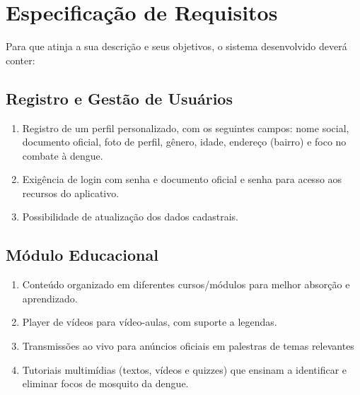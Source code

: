 \documentclass[a4paper, 12pt]{article}
\begin{document}
\newpage
\section{Especificação de Requisitos}

Para que atinja a sua descrição e seus objetivos, o sistema desenvolvido deverá conter:

\subsection{Registro e Gestão de Usuários}
\begin{enumerate}
    \item Registro de um perfil personalizado, com os seguintes campos: nome social, documento oficial, foto de perfil, gênero, idade, endereço (bairro) e foco no combate à dengue.
    \item Exigência de login com senha e documento oficial e senha para acesso aos recursos do aplicativo.
    \item Possibilidade de atualização dos dados cadastrais.
\end{enumerate}

\subsection{Módulo Educacional}
\begin{enumerate}
    \item Conteúdo organizado em diferentes cursos/módulos para melhor absorção e aprendizado.
    \item Player de vídeos para vídeo-aulas, com suporte a legendas.
    \item Transmissões ao vivo para anúncios oficiais em palestras de temas relevantes
    \item Tutoriais multimídias (textos, vídeos e quizzes) que ensinam a identificar e eliminar focos de mosquito da dengue.
\end{enumerate}
\end{document}
